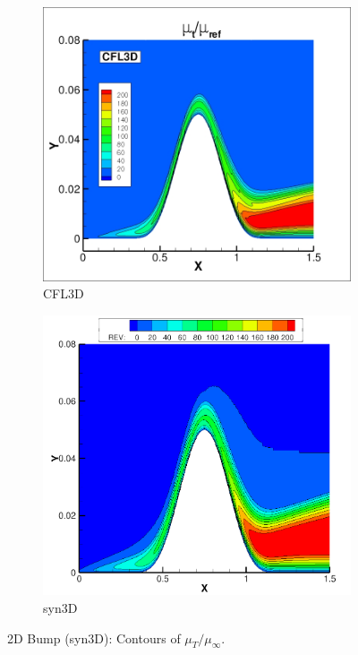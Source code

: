 \begin{figure}[ht!]
\centering
\begin{subfigure}{.45\textwidth}
  \centering
  \includegraphics[width=1.0\textwidth]{figs/2dbump/MutNASA.jpg}
  \caption{CFL3D}
\end{subfigure}%
\begin{subfigure}{.45\textwidth}
  \centering
  \includegraphics[width=1.0\textwidth]{figs/2dbump/RevContour2.png}
  \caption{syn3D}
\end{subfigure}
\caption{2D Bump (syn3D): Contours of $\mu_T/\mu_{\infty}$.}
\label{fig:syn2dbumpmutcontour}
\end{figure}

